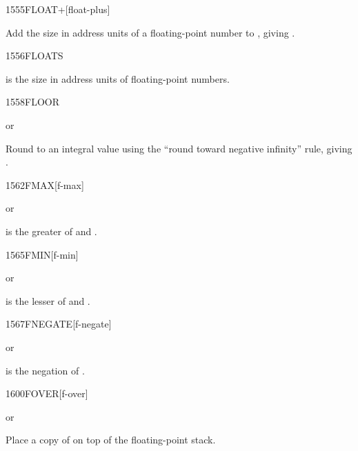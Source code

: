 \begin{worddef}{1555}{FLOAT+}[float-plus]
\item {}

	Add the size in address units of a floating-point number to
	, giving .
\end{worddef}


\begin{worddef}{1556}{FLOATS}
\item {}

	 is the size in address units of  floating-point
	numbers.
\end{worddef}


\begin{worddef}{1558}{FLOOR}
\item {} or

	Round  to an integral value using the ``round toward
	negative infinity'' rule, giving .
\end{worddef}


\begin{worddef}{1562}{FMAX}[f-max]
\item {} or

	 is the greater of  and .
\end{worddef}


\begin{worddef}{1565}{FMIN}[f-min]
\item {} or

	 is the lesser of  and .
\end{worddef}


\begin{worddef}{1567}{FNEGATE}[f-negate]
\item {} or

	 is the negation of .
\end{worddef}


\begin{worddef}{1600}{FOVER}[f-over]
\item {} or

	Place a copy of  on top of the floating-point stack.
\end{worddef}


